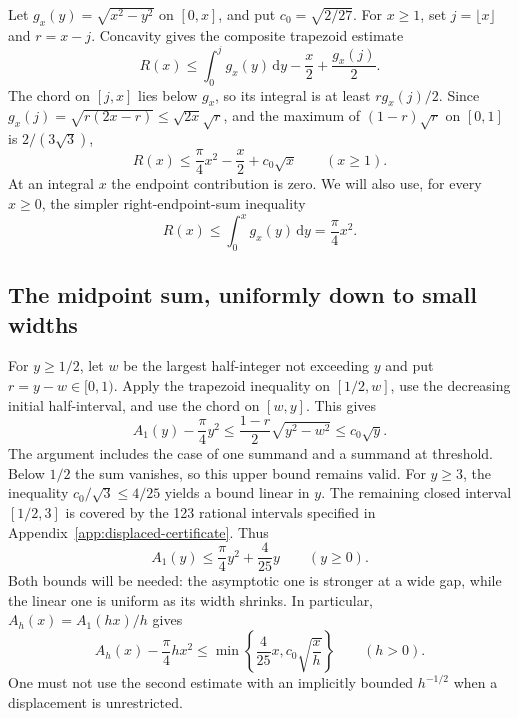 \documentclass[11pt,reqno]{amsart}
\numberwithin{equation}{section}
\newcommand{\dd}{\,\mathrm d}
\begin{document}
Let $g_x(y)=\sqrt{x^2-y^2}$ on $[0,x]$, and put
$c_0=\sqrt{2/27}$. For $x\ge1$, set $j=\lfloor x\rfloor$
and $r=x-j$. Concavity gives the composite trapezoid estimate
\[
 R(x)\le\int_0^j g_x(y)\dd y-\frac x2+\frac{g_x(j)}2.
\]
The chord on $[j,x]$ lies below $g_x$, so its integral is at
least $r g_x(j)/2$. Since
$g_x(j)=\sqrt{r(2x-r)}\le\sqrt{2x}\sqrt r$, and the maximum
of $(1-r)\sqrt r$ on $[0,1]$ is $2/(3\sqrt3)$,
\begin{equation}\label{eq:R-upper}
 R(x)\le\frac\pi4x^2-\frac x2+c_0\sqrt x
 \qquad(x\ge1).
\end{equation}
At an integral $x$ the endpoint contribution is zero.
We will also use, for every $x\ge0$, the simpler
right-endpoint-sum inequality
\begin{equation}\label{eq:R-integral}
 R(x)\le\int_0^x g_x(y)\dd y=\frac\pi4x^2.
\end{equation}

\subsection*{The midpoint sum, uniformly down to small widths}

For $y\ge1/2$, let $w$ be the largest half-integer not
exceeding $y$ and put $r=y-w\in[0,1)$. Apply the trapezoid
inequality on $[1/2,w]$, use the decreasing initial
half-interval, and use the chord on $[w,y]$. This gives
\[
 A_1(y)-\frac\pi4y^2
 \le\frac{1-r}{2}\sqrt{y^2-w^2}
 \le c_0\sqrt y.
\]
The argument includes the case of one summand and a summand
at threshold. Below $1/2$ the sum vanishes, so this upper
bound remains valid. For $y\ge3$, the inequality
$c_0/\sqrt3\le4/25$ yields a bound linear in $y$.
The remaining closed interval $[1/2,3]$ is covered by the
123 rational intervals specified in
Appendix~\ref{app:displaced-certificate}. Thus
\begin{equation}\label{eq:rect-midpoint}
 A_1(y)\le\frac\pi4y^2+\frac4{25}y
 \qquad(y\ge0).
\end{equation}
Both bounds will be needed: the asymptotic one is stronger
at a wide gap, while the linear one is uniform as its width
shrinks. In particular, $A_h(x)=A_1(hx)/h$ gives
\begin{equation}\label{eq:midpoint-two-bounds}
 A_h(x)-\frac\pi4hx^2
 \le\min\left\{\frac4{25}x,c_0\sqrt{\frac{x}{h}}\right\}
 \qquad(h>0).
\end{equation}
One must not use the second estimate with an implicitly
bounded $h^{-1/2}$ when a displacement is unrestricted.
\end{document}
